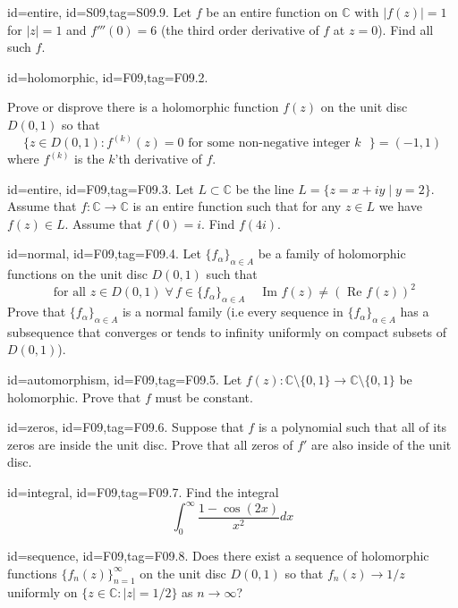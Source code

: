 \documentclass[12pt,letterpaper]{article}
\begin{document}
{\item[id=entire, id=S09,tag=S09.9.]
Let $f$ be an entire function on $\mathbb{C}$ with $| f(z) | = 1$ for $| z | = 1$ and $f'''(0) = 6$ (the third order derivative of $f$ at $z = 0$). Find all such $f$.

\item[id=holomorphic, id=F09,tag=F09.2.]

Prove or disprove there is a holomorphic function $f(z)$ on the unit disc $D(0,1)$ so that
\[
	\{z \in D(0,1) \colon f^{(k)}(z) = 0 \text{ for some non-negative integer $k$ } \} = (-1,1)
\]
where $f^{(k)}$ is the $k$'th derivative of $f$.

\item[id=entire, id=F09,tag=F09.3.]
Let $L \subset \mathbb{C}$ be the line $L = \{z = x + iy \mid y = 2\}$. Assume that $f : \mathbb{C} \rightarrow \mathbb{C}$ is an entire function such that for any $z \in L$ we have $f(z) \in L$. Assume that $f(0) = i$. Find $f(4i)$.

\item[id=normal, id=F09,tag=F09.4.]
Let $\{f_\alpha\}_{\alpha \in A}$ be a family of holomorphic functions on the unit disc $D(0,1)$ such that
\[
	\text{ for all } z \in D(0,1) \; \forall \, f \in \{f_\alpha\}_{\alpha \in A} \quad \text{ Im }f(z) \ne (\text{ Re } f(z))^2
\]
Prove that $\{f_\alpha\}_{\alpha \in A}$ is a normal family (i.e every sequence in $\{f_\alpha\}_{\alpha \in A}$ has a subsequence that converges or tends to infinity uniformly on compact subsets of $D(0,1)$).

\item[id=automorphism, id=F09,tag=F09.5.]
Let $f(z) : \mathbb{C}\setminus\{0,1\} \rightarrow \mathbb{C}\setminus\{0,1\}$ be holomorphic. Prove that $f$ must be constant.

\item[id=zeros, id=F09,tag=F09.6.]
Suppose that $f$ is a polynomial such that all of its zeros are inside the unit disc. Prove that all zeros of $f'$ are also inside of the unit disc.

\item[id=integral, id=F09,tag=F09.7.]
Find the integral
\[
	\int_{0}^{\infty} \frac{1-\cos(2x)}{x^2} dx
\]

\item[id=sequence, id=F09,tag=F09.8.]
Does there exist a sequence of holomorphic functions $\{f_n(z)\}_{n=1}^{\infty}$ on the unit disc $D(0,1)$ so that $f_n(z) \rightarrow 1/z$ uniformly on $\{z \in \mathbb{C} \colon | z | = 1/2\}$ as $n\rightarrow\infty$?

}
\end{document}
